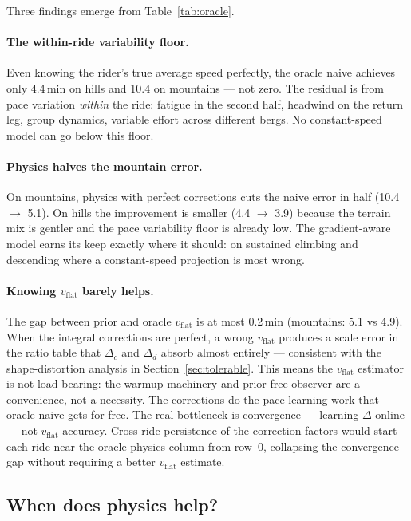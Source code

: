 \documentclass[11pt,a4paper]{article}
\begin{document}
Three findings emerge from Table~\ref{tab:oracle}.

\paragraph{The within-ride variability floor.}
Even knowing the rider's true average speed perfectly, the oracle
naive achieves only 4.4\,\si{\minute} on hills and 10.4 on
mountains --- not zero. The residual is from pace variation
\emph{within} the ride: fatigue in the second half, headwind on the
return leg, group dynamics, variable effort across different bergs.
No constant-speed model can go below this floor.

\paragraph{Physics halves the mountain error.}
On mountains, physics with perfect corrections cuts the naive error
in half (10.4 $\to$ 5.1). On hills the improvement is smaller (4.4
$\to$ 3.9) because the terrain mix is gentler and the pace
variability floor is already low. The gradient-aware model earns its
keep exactly where it should: on sustained climbing and descending
where a constant-speed projection is most wrong.

\paragraph{Knowing $v_{\text{flat}}$ barely helps.}
The gap between prior and oracle $v_{\text{flat}}$ is at most
0.2\,\si{\minute} (mountains: 5.1 vs 4.9). When the integral
corrections are perfect, a wrong $v_{\text{flat}}$ produces a scale
error in the ratio table that $\Delta_c$ and $\Delta_d$ absorb
almost entirely --- consistent with the shape-distortion analysis
in Section~\ref{sec:tolerable}. This means the $v_{\text{flat}}$
estimator is not load-bearing: the warmup machinery and prior-free
observer are a convenience, not a necessity. The corrections do the
pace-learning work that oracle naive gets for free. The real
bottleneck is convergence --- learning $\Delta$ online --- not
$v_{\text{flat}}$ accuracy. Cross-ride persistence of the correction
factors would start each ride near the oracle-physics column from
row~0, collapsing the convergence gap without requiring a better
$v_{\text{flat}}$ estimate.


\subsection{When does physics help?}
\label{sec:when-helps}
\end{document}

